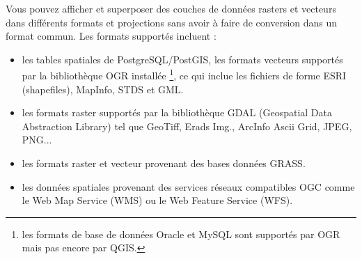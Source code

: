 

Vous pouvez afficher et superposer des couches de données rasters et vecteurs dans différents formats et projections sans avoir à faire de conversion dans un format commun. Les formats supportés incluent :


\begin{itemize}
\item les tables spatiales de PostgreSQL/PostGIS, les formats vecteurs supportés par la bibliothèque OGR installée \footnote{les formats de base de données Oracle et MySQL sont supportés par OGR mais pas encore par QGIS.}, ce qui inclue les fichiers de forme ESRI (shapefiles), MapInfo, STDS et GML.
\item les formats raster supportés par la bibliothèque GDAL (Geospatial Data Abstraction Library) tel que GeoTiff, Erads Img., ArcInfo Ascii Grid, JPEG, PNG...
\item les formats raster et vecteur provenant des bases données GRASS. 
\item les données spatiales provenant des services réseaux compatibles OGC comme le Web Map Service (WMS) ou le Web Feature Service (WFS).
\end{itemize}




